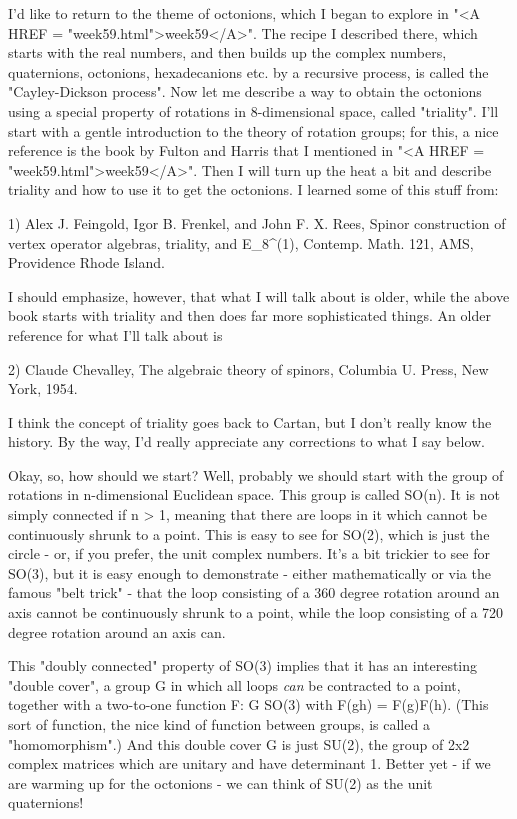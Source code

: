 

I'd like to return to the theme of octonions, which I began to explore
in "<A HREF = "week59.html">week59</A>".  The recipe I described there, which starts with the real
numbers, and then builds up the complex numbers, quaternions,
octonions, hexadecanions etc. by a recursive process, is called the
"Cayley-Dickson process".  Now let me describe a way to obtain the
octonions using a special property of rotations in 8-dimensional
space, called "triality".  I'll start with a gentle introduction to
the theory of rotation groups; for this, a nice reference is the book
by Fulton and Harris that I mentioned in "<A HREF = "week59.html">week59</A>".  Then I will turn
up the heat a bit and describe triality and how to use it to get the
octonions.  I learned some of this stuff from:

1) Alex J. Feingold, Igor B. Frenkel, and John F. X. Rees, 
Spinor construction of vertex operator algebras, triality, and
E_{8}^{(1)}, Contemp. Math. 121, AMS, Providence Rhode Island.
  

I should emphasize, however, that what I will talk about is older,
while the above book starts with triality and then does far more
sophisticated things.  An older reference for what I'll talk about is

2) Claude Chevalley, The algebraic theory of spinors, Columbia U. Press,
New York, 1954.  

I think the concept of triality goes back to Cartan, but I don't
really know the history.  By the way, I'd really appreciate any
corrections to what I say below.  

Okay, so, how should we start?  Well, probably we should start with
the group of rotations in n-dimensional Euclidean space.  This group
is called SO(n).  It is not simply connected if n > 1, meaning that
there are loops in it which cannot be continuously shrunk to a point.
This is easy to see for SO(2), which is just the circle - or, if you
prefer, the unit complex numbers.  It's a bit trickier to see for
SO(3), but it is easy enough to demonstrate - either mathematically
or via the famous "belt trick" - that the loop consisting of a 360
degree rotation around an axis cannot be continuously shrunk to a
point, while the loop consisting of a 720 degree rotation around an
axis can.

This "doubly connected" property of SO(3) implies that it has an
interesting "double cover", a group G in which all loops \emph{can} be
contracted to a point, together with a two-to-one function F: G \to 
SO(3) with F(gh) = F(g)F(h).  (This sort of function, the nice kind of
function between groups, is called a "homomorphism".)  And this double
cover G is just SU(2), the group of 2x2 complex matrices which are
unitary and have determinant 1.  Better yet - if we are warming up
for the octonions - we can think of SU(2) as the unit quaternions!

